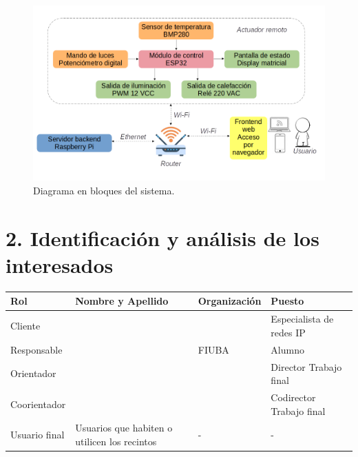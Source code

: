 \documentclass[
11pt, %
]{charter}
\begin{document}
\begin{figure}[htpb]
\centering 
\includegraphics[width=1\textwidth]{./Figuras/Diagrama-bloques.png}
\caption{Diagrama en bloques del sistema.}
\label{fig:diagBloques}
\end{figure}

\vspace{25px}

\section{2. Identificación y análisis de los interesados}
\label{sec:interesados}

\begin{table}[ht]
\begin{tabularx}{\linewidth}{@{}|l|X|X|l|@{}}
\hline
\rowcolor[HTML]{C0C0C0} 
Rol				& Nombre y Apellido	& Organización		& Puesto 	\\ \hline
Cliente			& \clientename		&\empclientename		& Especialista de redes IP 	\\ \hline
Responsable		& \authorname		& FIUBA				& Alumno 	\\ \hline
Orientador		& \supname			& \pertesupname		& Director Trabajo final \\ \hline
Coorientador		& \cosupname			& \pertecosupname	& Codirector Trabajo final \\ \hline
Usuario final	& Usuarios que habiten o utilicen los recintos	& -		& -       	\\ \hline
\end{tabularx}
\end{table}
\end{document}
